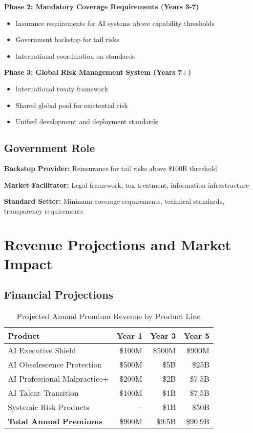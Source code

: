 \documentclass[11pt]{article}
\begin{document}
\textbf{Phase 2: Mandatory Coverage Requirements (Years 3-7)}
\begin{itemize}
   \item Insurance requirements for AI systems above capability thresholds
   \item Government backstop for tail risks
   \item International coordination on standards
\end{itemize}

\textbf{Phase 3: Global Risk Management System (Years 7+)}
\begin{itemize}
   \item International treaty framework
   \item Shared global pool for existential risk
   \item Unified development and deployment standards
\end{itemize}

\subsection{Government Role}

\textbf{Backstop Provider:} Reinsurance for tail risks above \$100B threshold

\textbf{Market Facilitator:} Legal framework, tax treatment, information infrastructure

\textbf{Standard Setter:} Minimum coverage requirements, technical standards, transparency requirements

\section{Revenue Projections and Market Impact}

\subsection{Financial Projections}

\begin{table}[h]
\centering
\begin{tabular}{lrrr}
\toprule
Product & Year 1 & Year 3 & Year 5 \\
\midrule
AI Executive Shield & \$100M & \$500M & \$900M \\
AI Obsolescence Protection & \$500M & \$5B & \$25B \\
AI Professional Malpractice+ & \$200M & \$2B & \$7.5B \\
AI Talent Transition & \$100M & \$1B & \$7.5B \\
Systemic Risk Products & -- & \$1B & \$50B \\
\midrule
\textbf{Total Annual Premiums} & \$900M & \$9.5B & \$90.9B \\
\bottomrule
\end{tabular}
\caption{Projected Annual Premium Revenue by Product Line}
\end{table}
\end{document}
